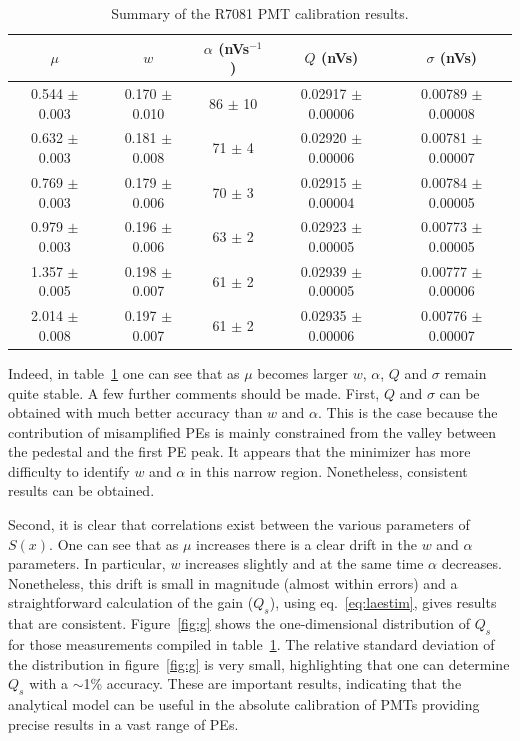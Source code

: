 \documentclass[preprint,12pt]{elsarticle}
\begin{document}
\begin{table}[t!]
\footnotesize
\centering
\begin{tabular}{| c  || c | c | c | c |}
\hline 
$\mu$  &  $w$ &  $\alpha$ (nVs$^{-1}$) &  $Q$ (nVs) &  $\sigma$ (nVs) \\[0.6ex] \hline\hline %
  0.544 $\pm$ 0.003 & 0.170 $\pm$  0.010 &  86 $\pm$ 10 & 0.02917  $\pm$ 0.00006 &  0.00789 $\pm$ 0.00008 \\ %
  0.632 $\pm$ 0.003 & 0.181 $\pm$  0.008 &  71 $\pm$ 4   & 0.02920  $\pm$ 0.00006 &  0.00781 $\pm$ 0.00007 \\ %
  0.769 $\pm$ 0.003 & 0.179 $\pm$  0.006 &  70 $\pm$ 3   & 0.02915  $\pm$ 0.00004 &  0.00784 $\pm$ 0.00005 \\ %
 0.979  $\pm$ 0.003 & 0.196 $\pm$  0.006 &  63 $\pm$ 2   & 0.02923  $\pm$ 0.00005 &  0.00773 $\pm$ 0.00005 \\ %
 1.357  $\pm$ 0.005 & 0.198 $\pm$  0.007 &  61 $\pm$ 2   & 0.02939  $\pm$ 0.00005 &  0.00777 $\pm$ 0.00006 \\ %
 2.014 $\pm$  0.008 & 0.197 $\pm$  0.007 &  61 $\pm$ 2   & 0.02935  $\pm$ 0.00006 &  0.00776 $\pm$ 0.00007 %
\\[0.6ex] \hline\hline
\end{tabular}
\caption{Summary of the R7081 PMT calibration results.}
\label{tab:money}
\end{table}

Indeed, in table~\ref{tab:money} one can see that as $\mu$ becomes larger $w$, $\alpha$, $Q$ and $\sigma$ remain quite stable. %
A few further comments should be made. 
First, $Q$ and $\sigma$ can be obtained with much better accuracy than $w$ and $\alpha$. 
This is the case because the contribution of misamplified PEs is mainly constrained from the valley between the pedestal and the first PE peak. 
It appears that the minimizer has more difficulty to identify $w$ and $\alpha$ in this narrow region. 
Nonetheless, consistent results can be obtained. 

Second, it is clear that correlations exist between the various parameters of $S(x)$. 
One can see that as $\mu$ increases there is a clear drift in the $w$ and $\alpha$ parameters. 
In particular, $w$ increases slightly and at the same time $\alpha$ decreases. 
Nonetheless, this drift is small in magnitude (almost within errors) and a straightforward calculation of the gain ($Q_s$), using eq.~\eqref{eq:laestim}, gives results that are consistent. 
Figure~\ref{fig:g} shows the one-dimensional distribution of $Q_s$ for those measurements compiled in table~\ref{tab:money}. 
The relative standard deviation of the distribution in figure~\ref{fig:g} is very small, highlighting that one can determine $Q_s$ with a $\sim$1\% accuracy. 
These are important results, indicating that the analytical model can be useful in the absolute calibration of PMTs providing precise results in a vast range of PEs.
\end{document}
